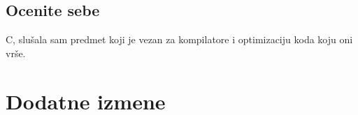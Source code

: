 \documentclass[a4paper]{report}
\begin{document}
\section{Ocenite sebe}

C, slušala sam predmet koji je vezan za kompilatore i optimizaciju koda koju oni vrše.

\chapter{Dodatne izmene}
\end{document}
